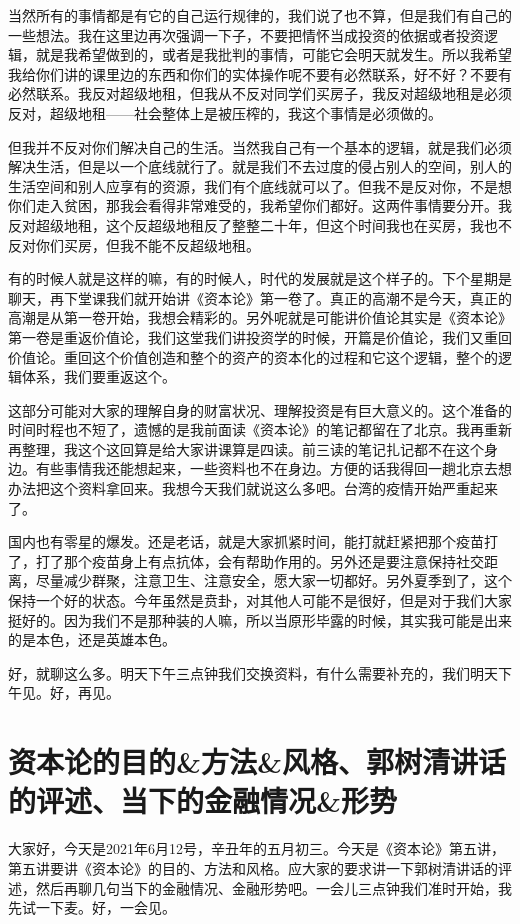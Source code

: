 \documentclass[UTF8, 12pt, a4paper]{ctexrep}
\begin{document}
当然所有的事情都是有它的自己运行规律的，我们说了也不算，但是我们有自己的一些想法。我在这里边再次强调一下子，不要把情怀当成投资的依据或者投资逻辑，就是我希望做到的，或者是我批判的事情，可能它会明天就发生。所以我希望我给你们讲的课里边的东西和你们的实体操作呢不要有必然联系，好不好？不要有必然联系。我反对超级地租，但我从不反对同学们买房子，我反对超级地租是必须反对，超级地租——社会整体上是被压榨的，我这个事情是必须做的。

但我并不反对你们解决自己的生活。当然我自己有一个基本的逻辑，就是我们必须解决生活，但是以一个底线就行了。就是我们不去过度的侵占别人的空间，别人的生活空间和别人应享有的资源，我们有个底线就可以了。但我不是反对你，不是想你们走入贫困，那我会看得非常难受的，我希望你们都好。这两件事情要分开。我反对超级地租，这个反超级地租反了整整二十年，但这个时间我也在买房，我也不反对你们买房，但我不能不反超级地租。

有的时候人就是这样的嘛，有的时候人，时代的发展就是这个样子的。下个星期是聊天，再下堂课我们就开始讲《资本论》第一卷了。真正的高潮不是今天，真正的高潮是从第一卷开始，我想会精彩的。另外呢就是可能讲价值论其实是《资本论》第一卷是重返价值论，我们这堂我们讲投资学的时候，开篇是价值论，我们又重回价值论。重回这个价值创造和整个的资产的资本化的过程和它这个逻辑，整个的逻辑体系，我们要重返这个。

这部分可能对大家的理解自身的财富状况、理解投资是有巨大意义的。这个准备的时间时程也不短了，遗憾的是我前面读《资本论》的笔记都留在了北京。我再重新再整理，我这个这回算是给大家讲课算是四读。前三读的笔记扎记都不在这个身边。有些事情我还能想起来，一些资料也不在身边。方便的话我得回一趟北京去想办法把这个资料拿回来。我想今天我们就说这么多吧。台湾的疫情开始严重起来了。

国内也有零星的爆发。还是老话，就是大家抓紧时间，能打就赶紧把那个疫苗打了，打了那个疫苗身上有点抗体，会有帮助作用的。另外还是要注意保持社交距离，尽量减少群聚，注意卫生、注意安全，愿大家一切都好。另外夏季到了，这个保持一个好的状态。今年虽然是贲卦，对其他人可能不是很好，但是对于我们大家挺好的。因为我们不是那种装的人嘛，所以当原形毕露的时候，其实我可能是出来的是本色，还是英雄本色。

好，就聊这么多。明天下午三点钟我们交换资料，有什么需要补充的，我们明天下午见。好，再见。

\section{资本论的目的\&方法\&风格、郭树清讲话的评述、当下的金融情况\&形势}

大家好，今天是2021年6月12号，辛丑年的五月初三。今天是《资本论》第五讲，第五讲要讲《资本论》的目的、方法和风格。应大家的要求讲一下郭树清讲话的评述，然后再聊几句当下的金融情况、金融形势吧。一会儿三点钟我们准时开始，我先试一下麦。好，一会见。
\end{document}

